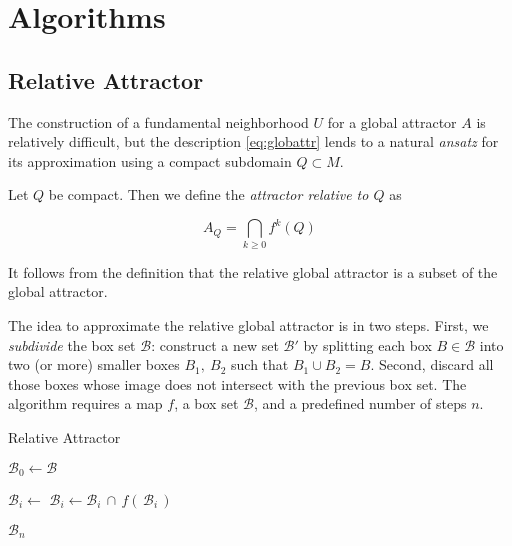 \section{Algorithms}


\subsection{Relative Attractor}

The construction of a fundamental neighborhood $U$ for a global attractor $A$ is
relatively difficult, but the description \autoref{eq:globattr} lends to 
a natural \emph{ansatz} for its approximation using a compact subdomain $Q \subset M$. \\

\begin{definition}
    Let $Q$ be compact. Then we define the \emph{attractor relative to $Q$} as

    \begin{equation}
        A_Q = \bigcap\limits_{k \geq 0} f^k (Q)
    \end{equation}

\end{definition}

\begin{remark}
    It follows from the definition that the relative global attractor is a subset of the 
    global attractor.\\
\end{remark}

The idea to approximate the relative global attractor is in two steps. First, we \emph{subdivide} 
the box set $\mathcal{B}$: construct a new set $\mathcal{B}'$ by splitting each box $B \in \mathcal{B}$ 
into two (or more) smaller boxes $B_1,\ B_2$ such that $B_1 \cup B_2 = B$. 
Second, discard all those boxes whose image does not intersect with the 
previous box set. The algorithm requires a map $f$, a box set $\mathcal{B}$, and a 
predefined number of steps $n$. 

\begin{algorithm}
    \caption{Relative Attractor}
    \label{alg:relativeattractor}

    \begin{algorithmic}[1]
        \State $\mathcal{B}_0 \gets \mathcal{B}$

            \State $\mathcal{B}_i \gets$ 
            \State $\mathcal{B}_i \gets \mathcal{B}_i\, \cap\, f (\,\mathcal{B}_i\,)$
        \EndFor

        \State \Return $\mathcal{B}_n$ 
    \end{algorithmic}
\end{algorithm}

